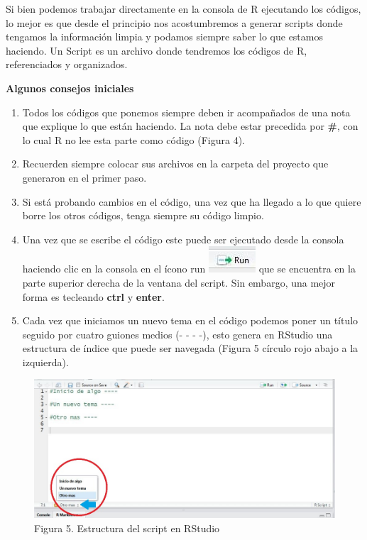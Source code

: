 \documentclass[]{article}
\providecommand{\tightlist}{%
  \setlength{\itemsep}{0pt}\setlength{\parskip}{0pt}}
\begin{document}
Si bien podemos trabajar directamente en la consola de R ejecutando los
códigos, lo mejor es que desde el principio nos acostumbremos a generar
scripts donde tengamos la información limpia y podamos siempre saber lo
que estamos haciendo. Un Script es un archivo donde tendremos los
códigos de R, referenciados y organizados.

\textbf{Algunos consejos iniciales}

\begin{enumerate}
\def\labelenumi{\alph{enumi}.}
\tightlist
\item
  Todos los códigos que ponemos siempre deben ir acompañados de una nota
  que explique lo que están haciendo. La nota debe estar precedida por
  \textbf{\#}, con lo cual R no lee esta parte como código (Figura 4).
\item
  Recuerden siempre colocar sus archivos en la carpeta del proyecto que
  generaron en el primer paso.
\item
  Si está probando cambios en el código, una vez que ha llegado a lo que
  quiere borre los otros códigos, tenga siempre su código limpio.
\item
  Una vez que se escribe el código este puede ser ejecutado desde la
  consola haciendo clic en la consola en el ícono run
  \includegraphics{imagen/RStudio_Run.jpg} que se encuentra en la parte
  superior derecha de la ventana del script. Sin embargo, una mejor
  forma es tecleando \textbf{ctrl} y \textbf{enter}.
\item
  Cada vez que iniciamos un nuevo tema en el código podemos poner un
  título seguido por cuatro guiones medios (- - - -), esto genera en
  RStudio una estructura de índice que puede ser navegada (Figura 5
  círculo rojo abajo a la izquierda).
\end{enumerate}

\begin{figure}[htbp]
\centering
\includegraphics{imagen/estructura.jpg}
\caption{Figura 5. Estructura del script en RStudio}
\end{figure}
\end{document}
